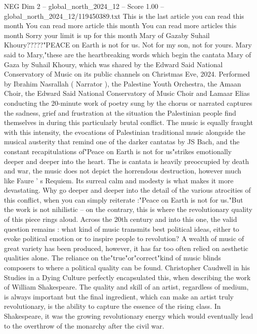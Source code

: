 \begin{textsample}{NEG Dim 2 – global\_north\_2024\_12 – Score 1.00 – global\_north\_2024\_12/119450389.txt}  \label{ex:f2_neg_263}
This is the last article you can read this month You can read more article this month You can read more articles this month Sorry your limit is up for this month Mary of Gazaby Suhail Khoury?????"PEACE on Earth is not for us.
Not for my son, not for yours.
Mary said to Mary,"these are the heartbreaking words which begin the cantata Mary of Gaza by Suhail Khoury, which was shared by the Edward Said National Conservatory of Music on its public channels on Christmas Eve, 2024.
Performed by Ibrahim Nasrallah ( Narrator ), the Palestine Youth Orchestra, the Amaan Choir, the Edward Said National Conservatory of Music Choir and Lamaar Elias conducting the 20-minute work of poetry sung by the chorus or narrated captures the sadness, grief and frustration at the situation the Palestinian people find themselves in during this particularly brutal conflict.
The music is equally fraught with this intensity, the evocations of Palestinian traditional music alongside the musical austerity that remind one of the darker cantatas by JS Bach, and the constant recapitulations of"Peace on Earth is not for us"strikes emotionally deeper and deeper into the heart.
The is cantata is heavily preoccupied by death and war, the music does not depict the horrendous destruction, however much like Faure ' s Requiem.
Its surreal calm and modesty is what makes it more devastating.
Why go deeper and deeper into the detail of the various atrocities of this conflict, when you can simply reiterate :"Peace on Earth is not for us."But the work is not nihilistic -- on the contrary, this is where the revolutionary quality of this piece rings aloud.
Across the 20th century and into this one, the valid question remains : what kind of music transmits best political ideas, either to evoke political emotion or to inspire people to revolution?
A wealth of music of great variety has been produced, however, it has far too often relied on aesthetic qualities alone.
The reliance on the"true"or"correct"kind of music blinds composers to where a political quality can be found.
Christopher Caudwell in his Studies in a Dying Culture perfectly encapsulated this, when describing the work of William Shakespeare.
The quality and skill of an artist, regardless of medium, is always important but the final ingredient, which can make an artist truly revolutionary, is the ability to capture the essence of the rising class.
In Shakespeare, it was the growing revolutionary energy which would eventually lead to the overthrow of the monarchy after the civil war.

\end{textsample}
